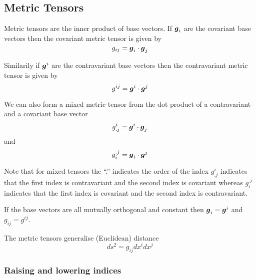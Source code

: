 \subsection{Metric Tensors}
\label{sec:metric tensors}

Metric tensors are the inner product of base vectors. If $\boldsymbol{g}_{i}$ are the
covariant base vectors then the covariant metric tensor is given by
\begin{equation}
  g_{ij}= \boldsymbol{g}_{i}  \cdot  \boldsymbol{g}_{j} 
\end{equation}

Similarily if $\boldsymbol{g}^{i}$ are the contravariant base vectors then the
contravariant metric tensor is given by 
\begin{equation}
  g^{ij}= \boldsymbol{g}^{i}  \cdot  \boldsymbol{g}^{j} 
\end{equation}

We can also form a mixed metric tensor from the dot product of a contravariant
and a covariant base vector \ie
\begin{equation}
  g^{i}_{.j}= \boldsymbol{g}^{i}  \cdot  \boldsymbol{g}_{j} 
\end{equation}
and 
\begin{equation}
  g_{i}^{.j}= \boldsymbol{g}_{i}  \cdot  \boldsymbol{g}^{j} 
\end{equation}

Note that for mixed tensors the ``.'' indicates the order of the index \ie
$g^{i}_{.j}$ indicates that the first index is contravariant and the second
index is covariant whereas $g_{i}^{.j}$ indicates that the first index is
covariant and the second index is contravariant.

If the base vectors are all mutually orthogonal and constant then
$\boldsymbol{g}_{i}=\boldsymbol{g}^{i}$ and $g_{ij}=g^{ij}$.

The metric tensors generalise (Euclidean) distance \ie
\begin{equation}
  ds^{2}=g_{ij}dx^{i}dx^{j}
\end{equation}

\subsubsection{Raising and lowering indices}

